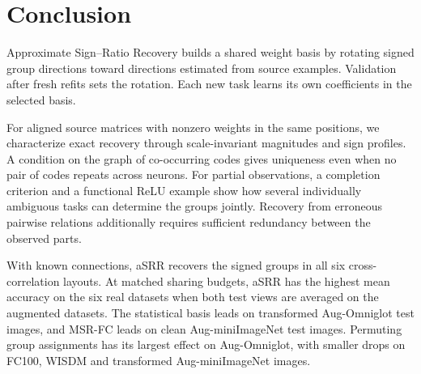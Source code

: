 \section{Conclusion}

Approximate Sign--Ratio Recovery builds a shared weight basis by
rotating signed group directions toward directions estimated from
source examples. Validation after fresh refits sets the rotation.
Each new task learns its own coefficients in the selected basis.

For aligned source matrices with nonzero weights in the same positions,
we characterize exact recovery through scale-invariant magnitudes and sign profiles.
A condition on the graph of co-occurring codes gives uniqueness even
when no pair of codes repeats across neurons.
For partial observations, a completion criterion and a functional
ReLU example show how several individually ambiguous tasks can
determine the groups jointly. Recovery from erroneous pairwise
relations additionally requires sufficient redundancy between
the observed parts.

With known connections, aSRR recovers the signed groups in all six
cross-correlation layouts. At matched sharing budgets, aSRR has the
highest mean accuracy on the six real datasets when both test views
are averaged on the augmented datasets. The statistical basis leads
on transformed Aug-Omniglot test images, and MSR-FC leads on clean
Aug-miniImageNet test images.
Permuting group assignments has its largest effect on Aug-Omniglot,
with smaller drops on FC100, WISDM and transformed Aug-miniImageNet
images.
